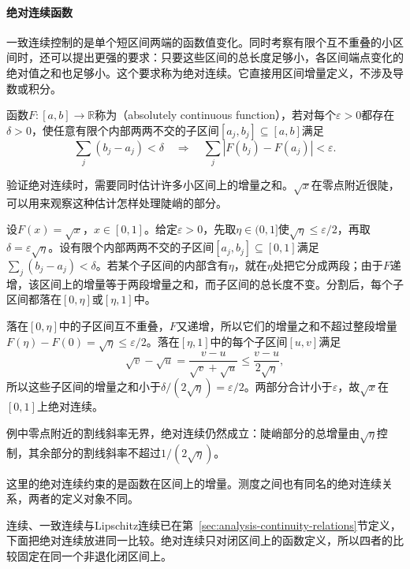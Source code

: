 \paragraph{绝对连续函数}
一致连续控制的是单个短区间两端的函数值变化。同时考察有限个互不重叠的小区间时，还可以提出更强的要求：只要这些区间的总长度足够小，各区间端点变化的绝对值之和也足够小。这个要求称为绝对连续。它直接用区间增量定义，不涉及导数或积分。
\begin{definition}[绝对连续函数]
\label{def:measurable-absolutely-continuous-function}
函数$F:[a,b]\to\mathbb R$称为（absolutely continuous function），若对每个$\varepsilon>0$都存在$\delta>0$，使任意有限个内部两两不交的子区间$[a_j,b_j]\subseteq[a,b]$满足
\[
 \sum_j(b_j-a_j)<\delta
 \quad\Longrightarrow\quad
 \sum_j|F(b_j)-F(a_j)|<\varepsilon.
\]
\end{definition}
验证绝对连续时，需要同时估计许多小区间上的增量之和。$\sqrt x$在零点附近很陡，可以用来观察这种估计怎样处理陡峭的部分。
\begin{example}
\label{ex:analysis-sqrt-absolutely-continuous}
设$F(x)=\sqrt x$，$x\in[0,1]$。给定$\varepsilon>0$，先取$\eta\in(0,1]$使$\sqrt\eta\leq\varepsilon/2$，再取$\delta=\varepsilon\sqrt\eta$。设有限个内部两两不交的子区间$[a_j,b_j]\subseteq[0,1]$满足$\sum_j(b_j-a_j)<\delta$。若某个子区间的内部含有$\eta$，就在$\eta$处把它分成两段；由于$F$递增，该区间上的增量等于两段增量之和，而子区间的总长度不变。分割后，每个子区间都落在$[0,\eta]$或$[\eta,1]$中。

落在$[0,\eta]$中的子区间互不重叠，$F$又递增，所以它们的增量之和不超过整段增量$F(\eta)-F(0)=\sqrt\eta\leq\varepsilon/2$。落在$[\eta,1]$中的每个子区间$[u,v]$满足
\[
 \sqrt v-\sqrt u=\frac{v-u}{\sqrt v+\sqrt u}\leq\frac{v-u}{2\sqrt\eta},
\]
所以这些子区间的增量之和小于$\delta/(2\sqrt\eta)=\varepsilon/2$。两部分合计小于$\varepsilon$，故$\sqrt x$在$[0,1]$上绝对连续。
\end{example}
例中零点附近的割线斜率无界，绝对连续仍然成立：陡峭部分的总增量由$\sqrt\eta$控制，其余部分的割线斜率不超过$1/(2\sqrt\eta)$。

这里的绝对连续约束的是函数在区间上的增量。测度之间也有同名的绝对连续关系，两者的定义对象不同。

连续、一致连续与Lipschitz连续已在第~\ref{sec:analysis-continuity-relations}节定义，下面把绝对连续放进同一比较。绝对连续只对闭区间上的函数定义，所以四者的比较固定在同一个非退化闭区间上。

